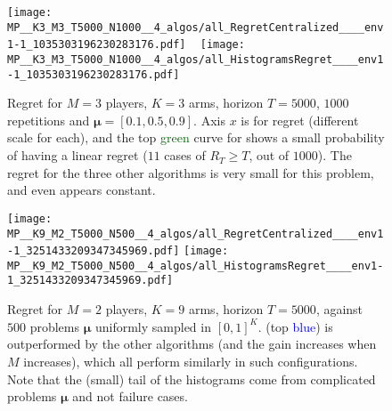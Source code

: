 %
%
\begin{figure}[!h]
  \centering
      \texttt{[image: MP\_\_K3\_M3\_T5000\_N1000\_\_4\_algos/all\_RegretCentralized\_\_\_\_env1-1\_1035303196230283176.pdf]}
  ~
      \texttt{[image: MP\_\_K3\_M3\_T5000\_N1000\_\_4\_algos/all\_HistogramsRegret\_\_\_\_env1-1\_1035303196230283176.pdf]}
  \caption[Third failure case of \Selfish]{Regret for $M=3$ players, $K=3$ arms, horizon $T=5000$, $1000$ repetitions and $\boldsymbol{\mu} = [0.1, 0.5, 0.9]$. Axis $x$ is for regret (different scale for each), and the top \textcolor{darkgreen}{green} curve for \Selfish{} shows a small probability of having a linear regret ($11$ cases of $R_T \geq T$, out of $1000$). The regret for the three other algorithms is very small for this problem, and even appears constant.}
  \label{fig:5:selfish_fail3}
\end{figure}

%
%

\begin{figure}[!h]
  \centering
      \texttt{[image: MP\_\_K9\_M2\_T5000\_N500\_\_4\_algos/all\_RegretCentralized\_\_\_\_env1-1\_3251433209347345969.pdf]}
      \texttt{[image: MP\_\_K9\_M2\_T5000\_N500\_\_4\_algos/all\_HistogramsRegret\_\_\_\_env1-1\_3251433209347345969.pdf]}
  \caption[Regret for $M=2$ players, $K=9$ arms, horizon $T=5000$, against $500$ problems $\boldsymbol{\mu}$ uniformly sampled]{Regret for $M=2$ players, $K=9$ arms, horizon $T=5000$, against $500$ problems $\boldsymbol{\mu}$ uniformly sampled in $[0,1]^K$. \rhoRand{} (top \textcolor{blue}{blue}) is outperformed by the other algorithms (and the gain increases when $M$ increases), which all perform similarly in such configurations. Note that the (small) tail of the histograms come from complicated problems $\boldsymbol{\mu}$ and not failure cases.}
  \label{fig:5:MP__K9_M2_T5000_N500__4_algos__all_RegretCentralized__BayesianProblems}
\end{figure}


